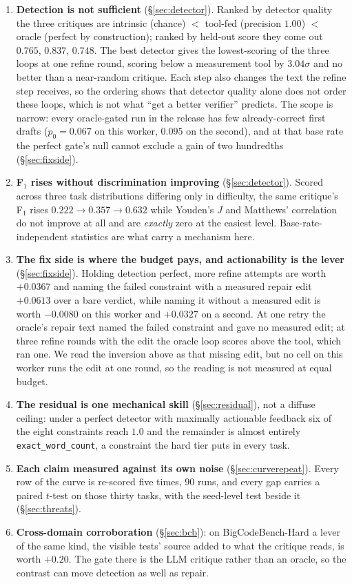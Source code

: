 \documentclass[11pt]{article}
\begin{document}
\begin{enumerate}
  \item \textbf{Detection is not sufficient} (\S\ref{sec:detector}). Ranked by
    detector quality the three critiques are intrinsic (chance) $<$ tool-fed (precision $1.00$)
    $<$ oracle (perfect by construction); ranked by held-out score they come out $0.765$, $0.837$,
    $0.748$. The best detector gives the lowest-scoring of the three loops at one refine round, scoring
    below a measurement tool by $3.04\sigma$ and no better than a near-random critique.
    Each step also changes the text the refine step receives, so the ordering shows that
    detector quality alone does not order these loops, which is not
    what ``get a better verifier'' predicts. The scope is narrow: every oracle-gated run in the
    release has few already-correct first drafts ($p_0 = 0.067$ on this worker, $0.095$ on the
    second), and at that base rate the perfect gate's null cannot exclude a gain of two
    hundredths (\S\ref{sec:fixside}).
  \item \textbf{F$_1$ rises without discrimination improving} (\S\ref{sec:detector}). Scored
    across three task distributions differing only in difficulty, the same critique's F$_1$ rises
    $0.222 \to 0.357 \to 0.632$ while Youden's $J$ and Matthews' correlation do not improve at all
    and are \emph{exactly} zero at the easiest level. Base-rate-independent statistics are what
    carry a mechanism here.
  \item \textbf{The fix side is where the budget pays, and actionability is the lever}
    (\S\ref{sec:fixside}). Holding detection perfect, more refine attempts are worth $+0.0367$ and
    naming the failed constraint with a measured repair edit $+0.0613$ over a bare verdict, while
    naming it without a measured edit is worth $-0.0080$ on this worker and $+0.0327$ on a second.
    At one retry the oracle's repair text named the failed constraint and gave no measured edit;
    at three refine rounds with the edit the oracle loop scores above the tool, which ran one. We
    read the inversion above as that missing edit, but no cell on this worker runs the edit at
    one round, so the reading is not measured at equal budget.
  \item \textbf{The residual is one mechanical skill} (\S\ref{sec:residual}), not a diffuse
    ceiling: under a perfect detector with maximally actionable feedback six of the eight
    constraints reach $1.0$ and the remainder is almost entirely \texttt{exact\_word\_count}, a
    constraint the hard tier puts in every task.
  \item \textbf{Each claim measured against its own noise} (\S\ref{sec:curverepeat}). Every row
    of the curve is re-scored five times, $90$ runs, and every gap carries a paired $t$-test on
    those thirty tasks, with the seed-level test beside it (\S\ref{sec:threats}).
  \item \textbf{Cross-domain corroboration} (\S\ref{sec:bcb}): on BigCodeBench-Hard a lever of
    the same kind, the visible tests' source added to what the critique reads, is worth $+0.20$.
    The gate there is the LLM critique rather than an oracle, so the contrast can move detection
    as well as repair.
\end{enumerate}
\end{document}
